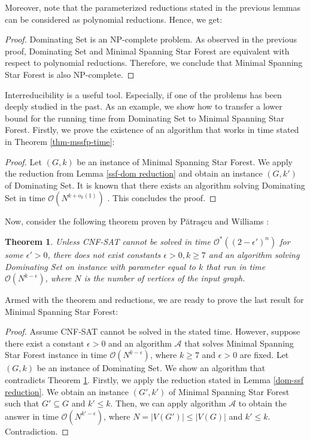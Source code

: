 \documentclass[en]{pracamgr}
\newtheorem{theorem}{Theorem}
\theoremstyle{definition}
\newcommand{\mssfp}{{\sc Minimal Spanning Star Forest}}
\newcommand{\domsetp}{{\sc Dominating Set}}
\newcommand{\cnfsat}{{\sc CNF-SAT}}
\begin{document}
Moreover, note that the parameterized reductions stated in the previous lemmas can be considered as polynomial reductions. Hence, we get:

\thmmssfpnpc*

\begin{proof}
	\domsetp{} is an NP-complete problem. As observed in the previous proof, \domsetp{} and \mssfp{} are equivalent with respect to polynomial reductions. Therefore, we conclude that \mssfp{} is  also NP-complete.
\end{proof}

Interreducibility is a useful tool. Especially, if one of the problems has been deeply studied in the past. As an example, we show how to transfer a lower bound for the running time from \domsetp{} to \mssfp{}. Firstly, we prove the existence of an algorithm that works in time stated in Theorem \ref{thm-mssfp-time}:

\thmmssfptime*

\begin{proof}
	Let $(G,k)$ be an instance of \mssfp{}. We apply the reduction from Lemma \ref{ssf-dom reduction} and obtain an instance $(G,k')$ of \domsetp{}. It is known that there exists an algorithm solving \domsetp{} in time $\mathcal{O}(N^{k + o_k(1)})$ \cite{DomSetAlg}. This concludes the proof.
\end{proof}

Now, consider the following theorem proven by Pătraşcu and Williams \cite{DomSet}:

\begin{theorem}\label{domset-seth}
	Unless \cnfsat{} cannot be solved in time $\mathcal{O}^*((2-\epsilon')^n)$ for some $\epsilon' > 0$, there does not exist constants $\epsilon > 0, k \geq 7$ and an algorithm solving \domsetp{} on instance with parameter equal to $k$ that run in time $\mathcal{O}(N^{k-\epsilon})$, where $N$ is the number of vertices of the input graph.
\end{theorem}

Armed with the theorem and reductions, we are ready to prove the last result for \mssfp{}:

\thmmssfplowerbound*

\begin{proof}
	Assume \cnfsat{} cannot be solved in the stated time. However, suppose there exist a constant $\epsilon > 0$ and an algorithm $\mathcal{A}$ that solves \mssfp{} instance in time $\mathcal{O}(N^{k-\epsilon})$, where $k \geq 7$ and $\epsilon > 0$ are fixed. Let $(G,k)$ be an instance of \domsetp{}. We show an algorithm that contradicts Theorem \ref{domset-seth}. Firstly, we apply the reduction stated in Lemma \ref{dom-ssf reduction}. We obtain an instance $(G',k')$ of \mssfp{} such that $G' \subseteq G$ and $k' \leq k$. Then, we can apply algorithm $\mathcal{A}$ to obtain the answer in time $\mathcal{O}(N^{k'-\epsilon})$, where $N=|V(G')| \leq |V(G)|$ and $k'\leq k$. Contradiction.
\end{proof}
\end{document}
